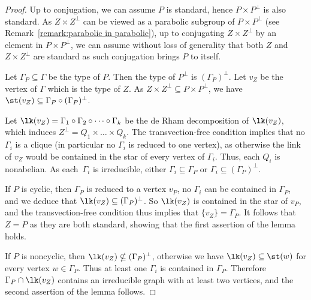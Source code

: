 \begin{proof}
Up to conjugation, we can assume $P$ is standard, hence $P\times P^\perp$ is also standard. As $Z\times Z^\perp$ can be viewed as a parabolic subgroup of $P\times P^\perp$ (see Remark~\ref{remark:parabolic in parabolic}), up to conjugating $Z\times Z^\perp$ by an element in $P\times P^\perp$, we can assume without loss of generality that both $Z$ and $Z\times Z^\perp$ are standard as such conjugation brings $P$ to itself.

Let $\Gamma_P\subseteq\Gamma$ be the type of $P$. Then the type of $P^\perp$ is $(\Gamma_P)^\perp$. Let $v_Z$ be the vertex of $\Gamma$ which is the type of $Z$. As $Z\times Z^{\perp}\subseteq P\times P^{\perp}$, we have $\st(v_Z)\subseteq \Gamma_P\circ (\Gamma_P)^\perp$.

Let $\lk(v_Z)=\Gamma_1\circ\Gamma_2\circ\cdots\circ\Gamma_k$ be the de Rham decomposition of $\lk(v_Z)$, which induces $Z^{\perp}=Q_1\times\dots \times Q_k$. The transvection-free condition implies that no $\Gamma_i$ is a clique (in particular no $\Gamma_i$ is reduced to one vertex), as otherwise the link of $v_Z$ would be contained in the star of every vertex of $\Gamma_i$. Thus, each $Q_i$ is nonabelian. As each~$\Gamma_i$ is irreducible, either $\Gamma_i\subseteq\Gamma_P$ or $\Gamma_i\subseteq (\Gamma_{P})^\perp$.

If $P$ is cyclic, then $\Gamma_P$ is reduced to a vertex $v_P$, no $\Gamma_i$ can be contained in $\Gamma_P$, and we deduce that $\lk(v_Z)\subseteq (\Gamma_P)^\perp$. So $\lk(v_Z)$ is contained in the star of $v_P$, and the transvection-free condition thus implies that $\{v_Z\}=\Gamma_P$. It follows that $Z=P$ as they are both standard, showing that the first assertion of the lemma holds.

If $P$ is noncyclic, then $\lk(v_Z)\nsubseteq (\Gamma_P)^\perp$, otherwise we have $\lk(v_Z)\subseteq \st(w)$ for every vertex $w\in\Gamma_P$. Thus at least one $\Gamma_i$ is contained in $\Gamma_P$. Therefore $\Gamma_P\cap\lk(v_Z)$ contains an irreducible graph with at least two vertices, and the second assertion of the lemma follows.
\end{proof}

\label{sec:full-support}

